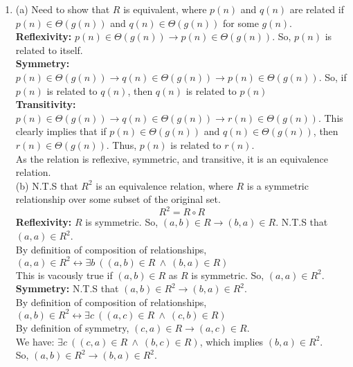 \documentclass[a4paper]{article}
\begin{document}
\begin{enumerate}
    \item (a) Need to show that $R$ is equivalent, where $p(n)$ and $q(n)$ are related if $p(n) \in \Theta(g(n))$ and $q(n) \in \Theta(g(n))$ for some $g(n)$.\\
    
    \textbf{Reflexivity:} $p(n) \in \Theta(g(n)) \rightarrow p(n) \in \Theta(g(n))$. So, $p(n)$ is related to itself.\\

    \textbf{Symmetry:} $p(n) \in \Theta(g(n)) \rightarrow q(n) \in \Theta(g(n)) \rightarrow p(n) \in \Theta(g(n))$. So, if $p(n)$ is related to $q(n)$, then $q(n)$ is related to $p(n)$\\

    \textbf{Transitivity:} $p(n) \in \Theta(g(n)) \rightarrow q(n) \in \Theta(g(n)) \rightarrow r(n) \in \Theta(g(n))$. This clearly implies that if $p(n) \in \Theta(g(n))$ and $q(n) \in \Theta(g(n))$, then $r(n) \in \Theta(g(n))$. Thus, $p(n)$ is related to $r(n)$.\\

    As the relation is reflexive, symmetric, and transitive, it is an equivalence relation.\\

    \vspace{0.5in}
    (b) N.T.S that $R^2$ is an equivalence relation, where $R$ is a symmetric relationship over some subset of the original set.
    $$R^2 = R \circ R$$
    \textbf{Reflexivity:} $R$ is symmetric. So, $(a, b) \in R \rightarrow (b, a) \in R$. N.T.S that $(a, a) \in R^2$.\\
    By definition of composition of relationships, $(a, a) \in R^2 \leftrightarrow \exists b\ ((a, b) \in R\ \land\ (b, a) \in R)$\\
    This is vacously true if $(a, b) \in R$ as $R$ is symmetric. So, $(a, a) \in R^2$.\\

    \textbf{Symmetry:} N.T.S that $(a, b) \in R^2 \rightarrow (b, a) \in R^2$.\\
    By definition of composition of relationships, $(a, b) \in R^2 \leftrightarrow \exists c\ ((a, c) \in R\ \land\ (c, b) \in R)$\\
    By definition of symmetry, $(c, a) \in R \rightarrow (a, c) \in R$.\\
    We have: $\exists c\ ((c, a) \in R\ \land\ (b, c) \in R)$, which implies $(b, a) \in R^2$.\\
    So, $(a, b) \in R^2 \rightarrow (b, a) \in R^2$.\\


\end{enumerate}
\end{document}
